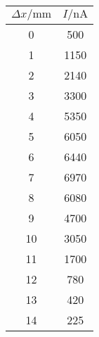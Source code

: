 \label{tab:tabT00}
	\begin{tabular}{S[table-format=2.0]S[table-format=4.0]}
		\toprule
		{$\Delta x/ \si{\milli\meter}$} & {$ I / \si{\nano\ampere}$} \\
		 &  500 \\
		 1 & 1150 \\
		 2 & 2140 \\
		 3 & 3300 \\
		 4 & 5350 \\
		 5 & 6050 \\
		 6 & 6440 \\
		 7 & 6970 \\
		 8 & 6080 \\
		 9 & 4700 \\
		10 & 3050 \\
		11 & 1700 \\
		12 &  780 \\
		13 &  420 \\
		14 &  225 \\
		\bottomrule
	\end{tabular}
